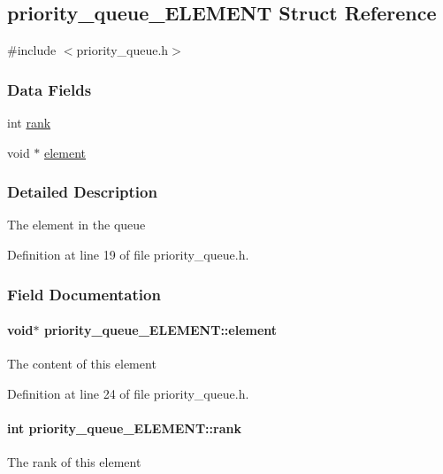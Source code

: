 \hypertarget{a00006}{\subsection{priority\-\_\-queue\-\_\-\-E\-L\-E\-M\-E\-N\-T Struct Reference}
\label{a00006}
}


{\ttfamily \#include $<$priority\-\_\-queue.\-h$>$}

\subsubsection*{Data Fields}
\begin{DoxyCompactItemize}
\item 
int \hyperlink{a00006_a470b27f9697e0f910ae956d26d71f924}{rank}
\item 
void $\ast$ \hyperlink{a00006_a1360ad1d3b5d68be281eed755375a3f8}{element}
\end{DoxyCompactItemize}


\subsubsection{Detailed Description}
The element in the queue 

Definition at line 19 of file priority\-\_\-queue.\-h.



\subsubsection{Field Documentation}
\hypertarget{a00006_a1360ad1d3b5d68be281eed755375a3f8}{
\paragraph[{element}]{\setlength{\rightskip}{0pt plus 5cm}void$\ast$ priority\-\_\-queue\-\_\-\-E\-L\-E\-M\-E\-N\-T\-::element}}\label{a00006_a1360ad1d3b5d68be281eed755375a3f8}
The content of this element 

Definition at line 24 of file priority\-\_\-queue.\-h.

\hypertarget{a00006_a470b27f9697e0f910ae956d26d71f924}{
\paragraph[{rank}]{\setlength{\rightskip}{0pt plus 5cm}int priority\-\_\-queue\-\_\-\-E\-L\-E\-M\-E\-N\-T\-::rank}}\label{a00006_a470b27f9697e0f910ae956d26d71f924}
The rank of this element 

